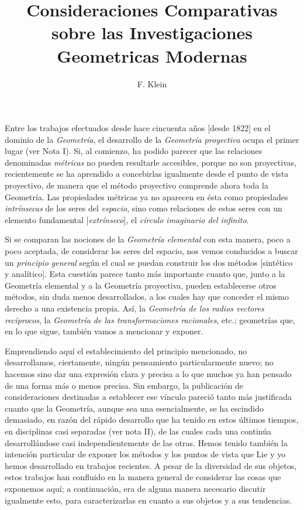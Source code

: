 \documentclass[a4paper, 12pt]{article}
\title{Consideraciones Comparativas sobre las Investigaciones Geometricas Modernas}
\author{F. Klein}
\date{}
\begin{document}
\begin{tcolorbox}[colback=blue!5!white,colframe=blue!75!black]

\vspace{-1.8cm}
\textbf \maketitle

\end{tcolorbox}

\bigskip

Entre los trabajos efectuados desde hace cincuenta años [desde 1822] en el dominio de la \textit{Geometría}, el desarrollo de la \textit{Geometría proyectiva} ocupa el primer lugar (ver Nota I). Si, al comienzo, ha podido parecer que las relaciones denominadas \textit{métricas} no pueden resultarle accesibles, porque no son proyectivas, recientemente se ha aprendido a concebirlas igualmente desde el punto de vista proyectivo, de manera que el método proyectivo comprende ahora toda la Geometría. Las propiedades métricas ya no aparecen en ésta como propiedades \textit{intrínsecas} de los seres del \textit{espacio}, sino como relaciones de estos seres con un elemento fundamental [\textit{extrínseco}], el \textit{círculo imaginario del infinito}.

Si se comparan las nociones de la \textit{Geometría elemental} con esta manera, poco a poco aceptada, de considerar los seres del espacio, nos vemos conducidos a buscar un \textit{principio general} según el cual se puedan construir los dos métodos [sintético y analítico]. Esta cuestión parece tanto más importante cuanto que, junto a la Geometría elemental y a la Geometría proyectiva, pueden establecerse otros métodos, sin duda menos desarrollados, a los cuales hay que conceder el mismo derecho a una existencia propia. Así, la \textit{Geometría de los radios vectores recíprocos}, la \textit{Geometría de las transformaciones racionales}, etc.; geometrías que, en lo que sigue, también vamos a mencionar y exponer.

Emprendiendo aquí el establecimiento del principio mencionado, no desarrollamos, ciertamente, ningún pensamiento particularmente nuevo; no hacemos sino dar una expresión clara y precisa a lo que muchos ya han pensado de una forma más o menos precisa. Sin embargo, la publicación de consideraciones destinadas a establecer ese vínculo pareció tanto más justificada cuanto que la Geometría, aunque sea una esencialmente, se ha escindido demasiado, en razón del rápido desarrollo que ha tenido en estos últimos tiempos, en disciplinas casi separadas (ver nota II), de las cuales cada una continúa desarrollándose casi independientemente de las otras. Hemos tenido también la intención particular de exponer los métodos y los puntos de vista que Lie y yo hemos desarrollado en trabajos recientes. A pesar de la diversidad de sus objetos, estos trabajos han confluido en la manera general de considerar las cosas que exponemos aquí; a continuación, era de alguna manera necesario discutir igualmente esto, para caracterizarlas en cuanto a sus objetos y a sus tendencias.
\end{document}
